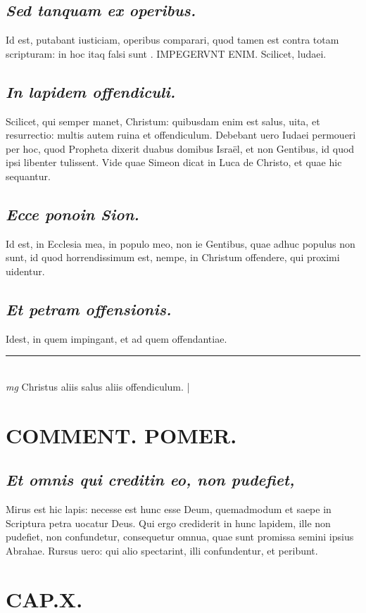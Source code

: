 \documentclass{article}
\begin{document}
\begin{pages}
\subsection*{\textit{Sed tanquam ex operibus. }}\pstart Id est, putabant iusticiam, operibus comparari, quod tamen est contra totam scripturam: in hoc itaq falsi sunt . IMPEGERVNT ENIM.  Scilicet, ludaei.   \pend
{}
{}
\subsection*{\textit{In lapidem offendiculi. }}\pstart Scilicet, qui semper manet, Christum: quibusdam enim est salus, uita, et resurrectio: multis autem ruina et offendiculum. Debebant uero Iudaei permoueri per hoc, quod Propheta dixerit duabus domibus Israël, et non Gentibus, id quod ipsi libenter tulissent.  Vide quae Simeon dicat in Luca de Christo, et quae hic sequantur.   \pend
{}
{}
\subsection*{\textit{Ecce ponoin Sion. }}\pstart Id est, in Ecclesia mea, in populo meo, non ie Gentibus, quae adhuc populus non sunt, id quod horrendissimum est, nempe, in Christum offendere, qui proximi uidentur.   \pend
{}
{}
\subsection*{\textit{Et petram offensionis. }}\pstart Idest, in quem impingant, et ad quem offendantiae.  \pend
\vspace{0.5cm}\noindent
\vspace{0.2cm}\rule{1cm}{0.2pt}\\ 
\hspace{0.2cm}\textit{mg}
\footnotesize Christus aliis salus aliis offendiculum.  
\normalsize| 
\section*{COMMENT. POMER.  }
{}
\subsection*{\textit{Et omnis qui creditin eo, non pudefiet, }}\pstart Mirus est hic lapis: necesse est hunc esse Deum, quemadmodum et saepe in Scriptura petra uocatur Deus. Qui ergo crediderit in hunc lapidem, ille non pudefiet, non confundetur, consequetur omnua, quae sunt promissa semini ipsius Abrahae. Rursus uero: qui alio spectarint, illi confundentur, et peribunt.   \pend
\endnumbering\beginnumbering\section{CAP.X.}
{}

\end{pages}
\end{document}
